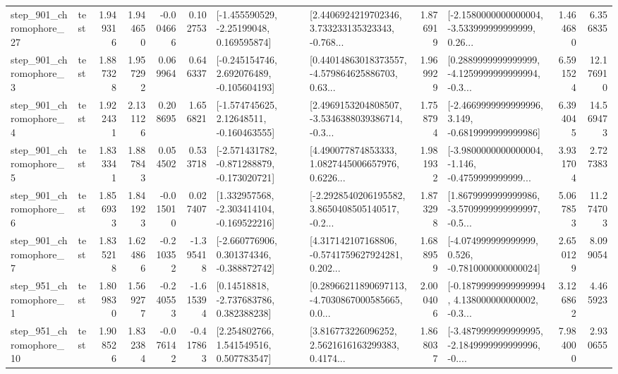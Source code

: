 \begin{tabular}{llrrrrllrlrr}
  step\_901\_chromophore\_27 &      test &      1.949316 &    1.944650 &     -0.004666 &  0.102753 &    [-1.455590529, -2.25199048, 0.169595874] &  [2.4406924219702346, 3.733233135323343, -0.768... &       1.876919 &  [-2.1580000000000004, -3.533999999999999, 0.26... &            1.464680 &          6.356835 \\
   step\_901\_chromophore\_3 &      test &      1.887328 &    1.957292 &      0.069964 &  0.646337 &   [-0.245154746, 2.692076489, -0.105604193] &  [0.44014863018373557, -4.579864625886703, 0.63... &       1.969929 &  [0.2889999999999999, -4.1259999999999994, -0.3... &            6.591524 &         12.176910 \\
   step\_901\_chromophore\_4 &      test &      1.922431 &    2.131126 &      0.208695 &  1.656821 &    [-1.574745625, 2.12648511, -0.160463555] &  [2.4969153204808507, -3.5346388039386714, -0.3... &       1.758794 &  [-2.4669999999999996, 3.149, -0.6819999999999986] &            6.394045 &         14.569473 \\
   step\_901\_chromophore\_5 &      test &      1.833341 &    1.887843 &      0.054502 &  0.533718 &  [-2.571431782, -0.871288879, -0.173020721] &  [4.490077874853333, 1.0827445006657976, 0.6226... &       1.981932 &  [-3.9800000000000004, -1.146, -0.4759999999999... &            3.931704 &          2.727383 \\
   step\_901\_chromophore\_6 &      test &      1.856933 &    1.841923 &     -0.015010 &  0.027407 &   [1.332957568, -2.303414104, -0.169522216] &  [-2.2928540206195582, 3.8650408505140517, -0.2... &       1.873298 &  [1.8679999999999986, -3.5709999999999997, -0.5... &            5.067853 &         11.274703 \\
   step\_901\_chromophore\_7 &      test &      1.835218 &    1.624866 &     -0.210352 & -1.395418 &   [-2.660776906, 0.301374346, -0.388872742] &  [4.317142107168806, -0.5741759627924281, 0.202... &       1.688959 &   [-4.074999999999999, 0.526, -0.7810000000000024] &            2.650129 &          8.099054 \\
   step\_951\_chromophore\_1 &      test &      1.809830 &    1.569277 &     -0.240553 & -1.615394 &     [0.14518818, -2.737683786, 0.382388238] &  [0.28966211890697113, -4.7030867000585665, 0.0... &       2.000406 &  [-0.18799999999999994, 4.138000000000002, -0.3... &            3.126862 &          4.465923 \\
  step\_951\_chromophore\_10 &      test &      1.908526 &    1.832384 &     -0.076142 & -0.417863 &     [2.254802766, 1.541549516, 0.507783547] &  [3.816773226096252, 2.5621616163299383, 0.4174... &       1.868037 &  [-3.4879999999999995, -2.1849999999999996, -0.... &            7.984000 &          2.930655 \\

\end{tabular}
